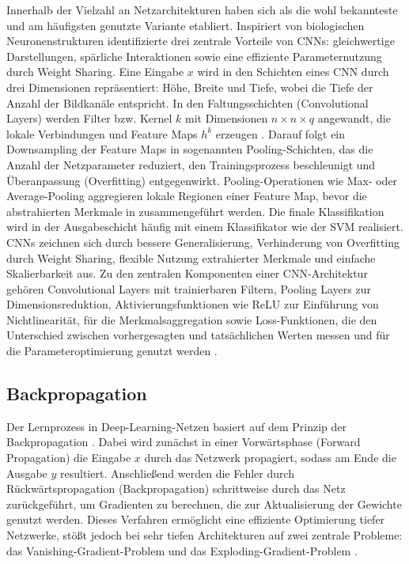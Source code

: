 Innerhalb der Vielzahl an Netzarchitekturen haben sich  als die wohl bekannteste und am häufigsten genutzte Variante etabliert. Inspiriert von biologischen Neuronenstrukturen identifizierte \cite{Goodfellow-et-al-2016} drei zentrale Vorteile von CNNs: gleichwertige Darstellungen, spärliche Interaktionen sowie eine effiziente Parameternutzung durch Weight Sharing. Eine Eingabe $x$ wird in den Schichten eines CNN durch drei Dimensionen repräsentiert: Höhe, Breite und Tiefe, wobei die Tiefe der Anzahl der Bildkanäle entspricht. In den Faltungsschichten (Convolutional Layers) werden Filter bzw. Kernel $k$ mit Dimensionen $n \times n \times q$ angewandt, die lokale Verbindungen und Feature Maps $h^k$ erzeugen \cite{Alzubaidi2021}. %
Darauf folgt ein Downsampling der Feature Maps in sogenannten Pooling-Schichten, das die Anzahl der Netzparameter reduziert, den Trainingsprozess beschleunigt und Überanpassung (Overfitting) entgegenwirkt. Pooling-Operationen wie Max- oder Average-Pooling aggregieren lokale Regionen einer Feature Map, bevor die abstrahierten Merkmale in  zusammengeführt werden. Die finale Klassifikation wird in der Ausgabeschicht häufig mit einem Klassifikator wie der \acrfull{SVM} realisiert. CNNs zeichnen sich durch bessere Generalisierung, Verhinderung von Overfitting durch Weight Sharing, flexible Nutzung extrahierter Merkmale und einfache Skalierbarkeit aus. Zu den zentralen Komponenten einer \acrshort{CNN}-Architektur gehören Convolutional Layers mit trainierbaren Filtern, Pooling Layers zur Dimensionsreduktion, Aktivierungsfunktionen wie \acrfull{ReLU} zur Einführung von Nichtlinearität,  für die Merkmalsaggregation sowie Loss-Funktionen, die den Unterschied zwischen vorhergesagten und tatsächlichen Werten messen und für die Parameteroptimierung genutzt werden \cite{Alzubaidi2021}. 

\subsection{Backpropagation}

Der Lernprozess in Deep-Learning-Netzen basiert auf dem Prinzip der Backpropagation \cite{Goodfellow-et-al-2016}. Dabei wird zunächst in einer Vorwärtsphase (Forward Propagation) die Eingabe $x$ durch das Netzwerk propagiert, sodass am Ende die Ausgabe $y$ resultiert. Anschließend werden die Fehler durch Rückwärtspropagation (Backpropagation) schrittweise durch das Netz zurückgeführt, um Gradienten zu berechnen, die zur Aktualisierung der Gewichte genutzt werden. Dieses Verfahren ermöglicht eine effiziente Optimierung tiefer Netzwerke, stößt jedoch bei sehr tiefen Architekturen auf zwei zentrale Probleme: das Vanishing-Gradient-Problem und das Exploding-Gradient-Problem \cite{Alzubaidi2021}.  

